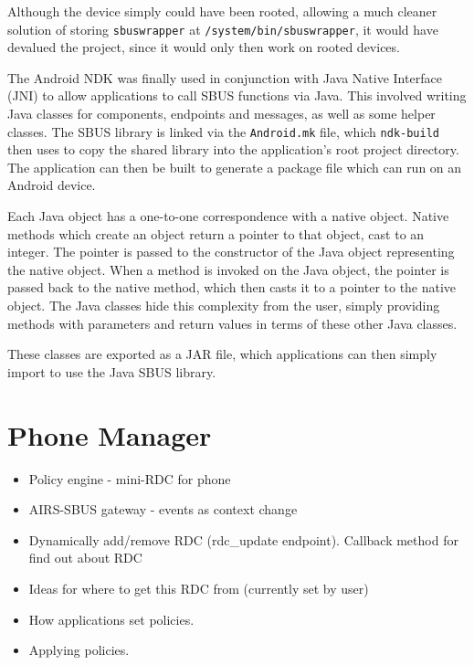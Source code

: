 \documentclass[12pt,twoside,notitlepage]{report}
\begin{document}
Although the device simply could have been rooted, allowing a much cleaner solution of storing {\tt sbuswrapper} at {\tt /system/bin/sbuswrapper}, it would have devalued the project, since it would only then work on rooted devices.


The Android NDK was finally used in conjunction with Java Native Interface (JNI) to allow applications to call SBUS functions via Java. 
This involved writing Java classes for components, endpoints and messages, as well as some helper classes. 
The SBUS library is linked via the {\tt Android.mk} file, which {\tt ndk-build} then uses to copy the shared library into the application's root project directory. 
The application can then be built to generate a package file which can run on an Android device.

Each Java object has a one-to-one correspondence with a native object. 
Native methods which create an object return a pointer to that object, cast to an integer. 
The pointer is passed to the constructor of the Java object representing the native object.
When a method is invoked on the Java object, the pointer is passed back to the native method, which then casts it to a pointer to the native object.
The Java classes hide this complexity from the user, simply providing methods with parameters and return values in terms of these other Java classes.

These classes are exported as a JAR file, which applications can then simply import to use the Java SBUS library.

\section{Phone Manager}

\begin{itemize}

\item Policy engine - mini-RDC for phone

\item AIRS-SBUS gateway - events as context change

\item Dynamically add/remove RDC (rdc\_update endpoint). Callback method for find out about RDC

\item Ideas for where to get this RDC from (currently set by user)

\item How applications set policies.

\item Applying policies.

\end{itemize}
\end{document}
